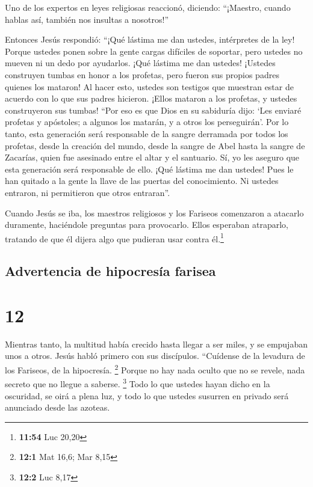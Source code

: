  Uno de los expertos en leyes religiosas reaccionó,
diciendo: ``¡Maestro, cuando hablas así, también nos insultas a
nosotros!''

 Entonces Jesús respondió: ``¡Qué lástima me dan ustedes,
intérpretes de la ley! Porque ustedes ponen sobre la gente cargas
difíciles de soportar, pero ustedes no mueven ni un dedo por ayudarlos.
 ¡Qué lástima me dan ustedes! ¡Ustedes construyen tumbas
en honor a los profetas, pero fueron sus propios padres quienes los
mataron!  Al hacer esto, ustedes son testigos que
muestran estar de acuerdo con lo que sus padres hicieron. ¡Ellos mataron
a los profetas, y ustedes construyeron sus tumbas!  ``Por
eso es que Dios en su sabiduría dijo: `Les enviaré profetas y apóstoles;
a algunos los matarán, y a otros los perseguirán'.  Por
lo tanto, esta generación será responsable de la sangre derramada por
todos los profetas, desde la creación del mundo,  desde
la sangre de Abel hasta la sangre de Zacarías, quien fue asesinado entre
el altar y el santuario. Sí, yo les aseguro que esta generación será
responsable de ello.  ¡Qué lástima me dan ustedes! Pues
le han quitado a la gente la llave de las puertas del conocimiento. Ni
ustedes entraron, ni permitieron que otros entraran''.

 Cuando Jesús se iba, los maestros religiosos y los
Fariseos comenzaron a atacarlo duramente, haciéndole preguntas para
provocarlo.  Ellos esperaban atraparlo, tratando de que
él dijera algo que pudieran usar contra él.\footnote{\textbf{11:54} Luc
  20,20}

\hypertarget{advertencia-de-hipocresuxeda-farisea}{%
\subsection{Advertencia de hipocresía
farisea}\label{advertencia-de-hipocresuxeda-farisea}}

\hypertarget{section-11}{%
\section{12}\label{section-11}}

 Mientras tanto, la multitud había crecido hasta llegar a
ser miles, y se empujaban unos a otros. Jesús habló primero con sus
discípulos. ``Cuídense de la levadura de los Fariseos, de la hipocresía.
\footnote{\textbf{12:1} Mat 16,6; Mar 8,15}  Porque no hay
nada oculto que no se revele, nada secreto que no llegue a saberse.
\footnote{\textbf{12:2} Luc 8,17}  Todo lo que ustedes
hayan dicho en la oscuridad, se oirá a plena luz, y todo lo que ustedes
susurren en privado será anunciado desde las azoteas.


